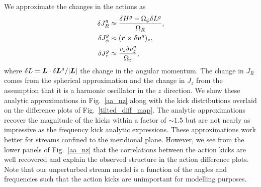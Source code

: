 \documentclass[useAMS,usenatbib,fleqn,a4paper]{mn2e}
\newcommand{\bs}[1]{\bmath{#1}}
\begin{document}
We approximate the changes in the actions as
\begin{equation}
\begin{split}
\delta J^g_R &\approx \frac{\delta H^g - \Omega_\phi\delta L^g}{\Omega_R},\\
\delta J^g_\phi &\approx (\bs{r}\times\delta\bs{v}^g)_z,\\
\delta J^g_z &\approx \frac{v_z \delta v^g_z}{\Omega_z},
\end{split}
\label{dJ_an}
\end{equation}
where $\delta L = \bs{L}\cdot\delta\bs{L}^g/|\bs{L}|$ the change in the angular momentum. The change in $J_R$ comes from the spherical approximation and the change in $J_z$ from the assumption that it is a harmonic oscillator in the $z$ direction. We show these analytic approximations in Fig.~\ref{aa_nz} along with the kick distributions overlaid on the difference plots of Fig.~\ref{tilted_diff_map}. The analytic approximations recover the magnitude of the kicks within a factor of $\sim1.5$ but are not nearly as impressive as the frequency kick analytic expressions. These approximations work better for streams confined to the meridional plane. However, we see from the lower panels of Fig.~\ref{aa_nz} that the correlations between the action kicks are well recovered and explain the observed structure in the action difference plots. Note that our unperturbed stream model is a function of the angles and frequencies such that the action kicks are unimportant for modelling purposes.
\end{document}
